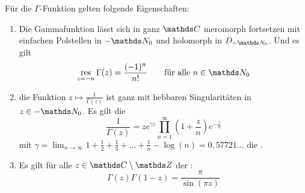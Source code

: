 \begin{satz}\label{satz:gamma-eigenschaften}
Für die $\Gamma$-Funktion gelten folgende Eigenschaften:
\begin{enumerate}
\item Die Gammafunktion lässt sich in ganz $\CC$ meromorph fortsetzen mit einfachen Polstellen in $-\NN_0$ und holomorph in $D_{-\NN_0}$. Und es gilt
\[
	\res_{z=-n} \Gamma(z)
	= \frac{(-1)^n}{n!}
	\qquad \text{für alle } n\in\NN_0
\]

\item die Funktion $z\mapsto \frac{1}{\Gamma(z)}$ ist ganz mit hebbaren Singularitäten in $z\in-\NN_0$. Es gilt die 
\[
	\frac{1}{\Gamma(z)} = ze^{\gamma z} \prod_{n=1}^\infty \left(1+\frac{z}{n}\right)e^{-\frac{z}{n}}
\]
mit $\gamma = \lim_{n\to\infty} 1 + \frac{1}{2} + \frac{1}{3} + \ldots + \frac{1}{n} - \log(n) = 0,57721\dots$ die .

\item Es gilt für alle $z\in\CC\setminus\ZZ$ der :
\[
	\Gamma(z)\Gamma(1-z)
	= \frac{\pi}{\sin(\pi z)}
\]
\end{enumerate}
\end{satz}

